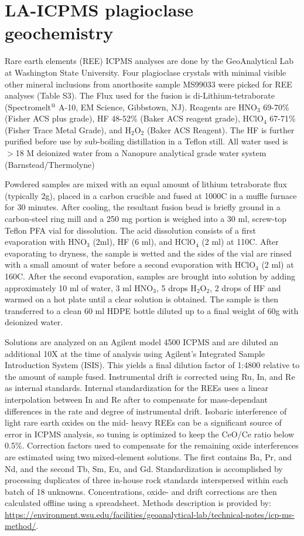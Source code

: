 \section*{LA-ICPMS plagioclase geochemistry}

Rare earth elements (REE) ICPMS analyses are done by the GeoAnalytical Lab at Washington State University. Four plagioclase crystals with minimal visible other mineral inclusions from anorthosite sample MS99033 were picked for REE analyses (Table S3). The Flux used for the fusion is di-Lithium-tetraborate (Spectromelt$^@$ A-10, EM Science, Gibbstown, NJ). Reagents are HNO$_3$ 69-70\% (Fisher ACS plus grade), HF 48-52\% (Baker ACS reagent grade), HClO$_4$ 67-71\% (Fisher Trace Metal Grade), and H$_2$O$_2$ (Baker ACS Reagent). The HF is further purified before use by sub-boiling distillation in a Teflon still.  All water used is $>$18 M deionized water from a Nanopure analytical grade water system (Barnstead/Thermolyne)

Powdered samples are mixed with an equal amount of lithium tetraborate flux (typically 2g), placed in a carbon crucible and fused at 1000\textdegree C in a muffle furnace for 30 minutes. After cooling, the resultant fusion bead is briefly ground in a carbon-steel ring mill and a 250 mg portion is weighed into a 30 ml, screw-top Teflon PFA vial for dissolution. The acid dissolution consists of a first evaporation with HNO$_3$ (2ml), HF (6 ml), and HClO$_4$ (2 ml) at 110\textdegree C. After evaporating to dryness, the sample is wetted and the sides of the vial are rinsed with a small amount of water before a second evaporation with HClO$_4$ (2 ml) at 160\textdegree C. After the second evaporation, samples are brought into solution by adding approximately 10 ml of water, 3 ml HNO$_3$, 5 drops H$_2$O$_2$, 2 drops of HF and warmed on a hot plate until a clear solution is obtained. The sample is then transferred to a clean 60 ml HDPE bottle diluted up to a final weight of 60g with deionized water.

Solutions are analyzed on an Agilent model 4500 ICPMS and are diluted an additional 10X at the time of analysis using Agilent’s Integrated Sample Introduction System (ISIS). This yields a final dilution factor of 1:4800 relative to the amount of sample fused. Instrumental drift is corrected using Ru, In, and Re as internal standards. Internal standardization for the REEs uses a linear interpolation between In and Re after \cite{Doherty1989a} to compensate for mass-dependant differences in the rate and degree of instrumental drift. Isobaric interference of light rare earth oxides on the mid- heavy REEs can be a significant source of error in ICPMS analysis, so tuning is optimized to keep the CeO/Ce ratio below 0.5\%. Correction factors used to compensate for the remaining oxide interferences are estimated using two mixed-element solutions. The first contains Ba, Pr, and Nd, and the second Tb, Sm, Eu, and Gd.  Standardization is accomplished by processing duplicates of three in-house rock standards interspersed within each batch of 18 unknowns. Concentrations, oxide- and drift corrections are then calculated offline using a spreadsheet. Methods description is provided by: \url{https://environment.wsu.edu/facilities/geoanalytical-lab/technical-notes/icp-ms-method/}.  



